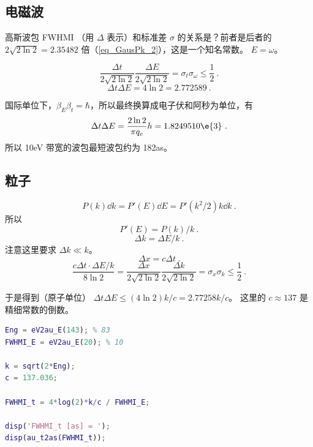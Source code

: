 
\subsection{电磁波}
高斯波包 FWHMI （用 $\Delta$ 表示）和标准差 $\sigma$ 的关系是？前者是后者的 $2\sqrt{2\ln 2} = 2.35482$ 倍（\autoref{eq_GausPk_2}），这是一个知名常数。
$E = \omega$。

\begin{equation}
\frac{\Delta t}{2\sqrt{2\ln 2}}\frac{\Delta E}{2\sqrt{2\ln 2}} = \sigma_t \sigma_\omega \leq \frac{1}{2}~.
\end{equation}
\begin{equation}
\Delta t\Delta E = 4\ln 2 = 2.772589~.
\end{equation}

国际单位下，$\beta_E\beta_t = \hbar$，所以最终换算成电子伏和阿秒为单位，有
\begin{equation}
\Delta t \Delta E  = \frac{2\ln 2}{\pi q_e}h = 1.8249510\e{3}~.
\end{equation}
所以 10eV 带宽的波包最短波包约为 182as。

\subsection{粒子}
\begin{equation}
P(k)\dd{k} = P'(E)\dd{E} = P'(k^2/2)k\dd{k}~.
\end{equation}
所以
\begin{equation}
P'(E) = P(k)/k~.
\end{equation}
\begin{equation}
\Delta k = \Delta E/k~.
\end{equation}
注意这里要求 $\Delta k \ll k$。
\begin{equation}
\Delta x = c\Delta t~.
\end{equation}
\begin{equation}
\frac{c\Delta t \cdot \Delta E/k}{8\ln 2} = \frac{\Delta x}{2\sqrt{2\ln 2}}\frac{\Delta k}{2\sqrt{2\ln 2}} = \sigma_x \sigma_k \leq \frac{1}{2}~.
\end{equation}

于是得到（原子单位） $\Delta t\Delta E \leq (4\ln 2)k/c = 2.77258 k/c$。 这里的 $c \approx 137$ 是精细常数的倒数。

\begin{lstlisting}[language=matlab]
% 以上计算的 Matlab 代码
Eng = eV2au_E(143); % 83
FWHMI_E = eV2au_E(20); % 10

k = sqrt(2*Eng);
c = 137.036;

FWHMI_t = 4*log(2)*k/c / FWHMI_E;

disp('FWHMI_t [as] = ');
disp(au_t2as(FWHMI_t));
\end{lstlisting}

